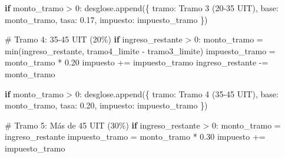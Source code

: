 \documentclass[
  doc,
  floatsintext,
  longtable,
  a4paper,
  nolmodern,
  notxfonts,
  notimes,
  12pt,
  colorlinks=true,linkcolor=blue,citecolor=blue,urlcolor=blue]{apa7}
\newenvironment{Shaded}{\begin{snugshade}}{\end{snugshade}}
\newcommand{\BuiltInTok}[1]{\textcolor[rgb]{0.00,0.23,0.31}{#1}}
\newcommand{\CommentTok}[1]{\textcolor[rgb]{0.37,0.37,0.37}{#1}}
\newcommand{\ControlFlowTok}[1]{\textcolor[rgb]{0.00,0.23,0.31}{\textbf{#1}}}
\newcommand{\DecValTok}[1]{\textcolor[rgb]{0.68,0.00,0.00}{#1}}
\newcommand{\FloatTok}[1]{\textcolor[rgb]{0.68,0.00,0.00}{#1}}
\newcommand{\NormalTok}[1]{\textcolor[rgb]{0.00,0.23,0.31}{#1}}
\newcommand{\OperatorTok}[1]{\textcolor[rgb]{0.37,0.37,0.37}{#1}}
\newcommand{\StringTok}[1]{\textcolor[rgb]{0.13,0.47,0.30}{#1}}
\begin{document}
\begin{Shaded}
\begin{Highlighting}[]
            \ControlFlowTok{if}\NormalTok{ monto\_tramo }\OperatorTok{\textgreater{}} \DecValTok{0}\NormalTok{:}
\NormalTok{                desglose.append(\{}
                    \StringTok{\textquotesingle{}tramo\textquotesingle{}}\NormalTok{: }\StringTok{\textquotesingle{}Tramo 3 (20{-}35 UIT)\textquotesingle{}}\NormalTok{,}
                    \StringTok{\textquotesingle{}base\textquotesingle{}}\NormalTok{: monto\_tramo,}
                    \StringTok{\textquotesingle{}tasa\textquotesingle{}}\NormalTok{: }\FloatTok{0.17}\NormalTok{,}
                    \StringTok{\textquotesingle{}impuesto\textquotesingle{}}\NormalTok{: impuesto\_tramo}
\NormalTok{                \})}
        
        \CommentTok{\# Tramo 4: 35{-}45 UIT (20\%)}
        \ControlFlowTok{if}\NormalTok{ ingreso\_restante }\OperatorTok{\textgreater{}} \DecValTok{0}\NormalTok{:}
\NormalTok{            monto\_tramo }\OperatorTok{=} \BuiltInTok{min}\NormalTok{(ingreso\_restante, tramo4\_limite }\OperatorTok{{-}}\NormalTok{ tramo3\_limite)}
\NormalTok{            impuesto\_tramo }\OperatorTok{=}\NormalTok{ monto\_tramo }\OperatorTok{*} \FloatTok{0.20}
\NormalTok{            impuesto }\OperatorTok{+=}\NormalTok{ impuesto\_tramo}
\NormalTok{            ingreso\_restante }\OperatorTok{{-}=}\NormalTok{ monto\_tramo}
            
            \ControlFlowTok{if}\NormalTok{ monto\_tramo }\OperatorTok{\textgreater{}} \DecValTok{0}\NormalTok{:}
\NormalTok{                desglose.append(\{}
                    \StringTok{\textquotesingle{}tramo\textquotesingle{}}\NormalTok{: }\StringTok{\textquotesingle{}Tramo 4 (35{-}45 UIT)\textquotesingle{}}\NormalTok{,}
                    \StringTok{\textquotesingle{}base\textquotesingle{}}\NormalTok{: monto\_tramo,}
                    \StringTok{\textquotesingle{}tasa\textquotesingle{}}\NormalTok{: }\FloatTok{0.20}\NormalTok{,}
                    \StringTok{\textquotesingle{}impuesto\textquotesingle{}}\NormalTok{: impuesto\_tramo}
\NormalTok{                \})}
        
        \CommentTok{\# Tramo 5: Más de 45 UIT (30\%)}
        \ControlFlowTok{if}\NormalTok{ ingreso\_restante }\OperatorTok{\textgreater{}} \DecValTok{0}\NormalTok{:}
\NormalTok{            monto\_tramo }\OperatorTok{=}\NormalTok{ ingreso\_restante}
\NormalTok{            impuesto\_tramo }\OperatorTok{=}\NormalTok{ monto\_tramo }\OperatorTok{*} \FloatTok{0.30}
\NormalTok{            impuesto }\OperatorTok{+=}\NormalTok{ impuesto\_tramo}
            

\end{Highlighting}
\end{Shaded}
\end{document}
